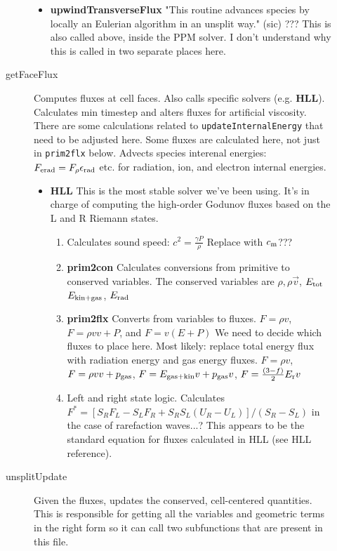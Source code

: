 \documentclass[preprint,11pt]{aastex}
\begin{document}
\begin{description}
\begin{description}
\begin{itemize}
			\item \textbf{upwindTransverseFlux} "This routine advances species by locally an Eulerian algorithm in an unsplit way." (sic) ??? This is also called above, inside the PPM solver.  I don't understand why this is called in two separate places here.
		\end{itemize}
		\item[getFaceFlux] Computes fluxes at cell faces.  Also calls specific solvers (e.g. \textbf{HLL}).  Calculates min timestep and alters fluxes for artificial viscosity. {\color{blue} There are some calculations related to \verb!updateInternalEnergy! that need to be adjusted here.  Some fluxes are calculated here, not just in \verb!prim2flx! below.}  {\color{red} Advects species interenal energies: $F_{\rm erad} = F_{\rho} \epsilon_{\rm rad}$ etc. for radiation, ion, and electron internal energies.}
		\begin{itemize}
			\item \textbf{HLL} This is the most stable solver we've been using.  It's in charge of computing the high-order Godunov fluxes based on the L and R Riemann states.
			\begin{enumerate}
				\item Calculates sound speed: {\color{red} $c^2 = \frac{\gamma P}{\rho}$} {\color{blue} Replace with $c_{\rm m}$???}
				\item \textbf{prim2con} Calculates conversions from primitive to conserved variables.  The conserved variables are $\rho, \rho \vec{v}$, {\color{red}$E_{\rm tot}$} {\color{blue}$E_{\rm kin+gas}$, $E_{\rm rad}$} \\
				\item \textbf{prim2flx} Converts from variables to fluxes.  {\color{red} $F = \rho v$, $F=\rho v v + P$, and $F= v(E + P)$} {\color{blue} We need to decide which fluxes to place here.  Most likely: replace total energy flux with radiation energy and gas energy fluxes.  $F=\rho v$, $F=\rho v v + p_{\rm gas}$, $F=E_{
			\rm gas + kin} v + p_{\rm gas} v$, $F=\frac{(3-f)}{2}E_{\rm r} v$}
				\item Left and right state logic.  Calculates $F^* = \left[ S_R F_L - S_L F_R + S_R S_L (U_R - U_L) \right]/(S_R-S_L)$ in the case of rarefaction waves...?  This appears to be the standard equation for fluxes calculated in HLL (see HLL reference).
			\end{enumerate}
		\end{itemize}
		\item[unsplitUpdate] Given the fluxes, updates the conserved, cell-centered quantities.  This is responsible for getting all the variables and geometric terms in the right form so it can call two subfunctions that are present in this file.

\end{description}
\end{description}
\end{document}
